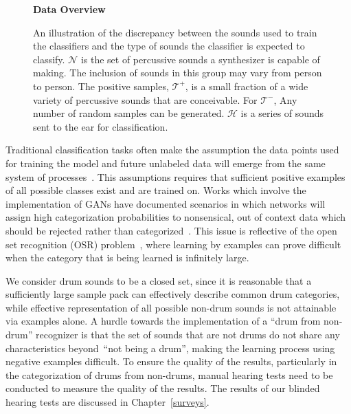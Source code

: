 \documentclass[\main/thesis.tex]{subfiles}
\begin{document}
\begin{figure}[]
    \begin{center}
    \textbf{Data Overview}
    \end{center}
    \caption{ An illustration of the discrepancy between the sounds used to train the classifiers and the type of sounds the classifier is expected to classify. $\mathcal{N}$ is the set of percussive sounds a synthesizer is capable of making. The inclusion of sounds in this group may vary from person to person. The positive samples, $\mathcal{T^{+}}$, is a small fraction of a wide variety of percussive sounds that are conceivable. For $\mathcal{T^{-}}$, Any number of random samples can be generated. $\mathcal{H}$ is a series of sounds sent to the ear for classification.}
\label{fig:ven_data}
\end{figure}

Traditional classification tasks often make the assumption the data points used for training the model and future unlabeled data will emerge from the same system of processes~\cite{geng2020recent,mundt2019open}. This assumptions requires that sufficient positive examples of all possible classes exist and are trained on. Works which involve the implementation of GANs have documented scenarios in which networks will assign high categorization probabilities to nonsensical, out of context data which should be rejected rather than categorized~\cite{geng2020recent,mundt2019open,hassen2020learning}. This issue is reflective of the open set recognition (OSR) problem~\cite{geng2020recent,mundt2019open}, where learning by examples can prove difficult when the category that is being learned is infinitely large. 

We consider drum sounds to be a closed set, since it is reasonable that a sufficiently large sample pack can effectively describe common drum categories, while effective representation of all possible non-drum sounds is not attainable via examples alone. A hurdle towards the implementation of a \enquote{drum from non-drum} recognizer is that the set of sounds that are not drums do not share any characteristics beyond~\enquote{not being a drum}, making the learning process using negative examples difficult.  To ensure the quality of the results, particularly in the categorization of drums from non-drums, manual hearing tests need to be conducted to measure the quality of the results. The results of our blinded hearing tests are discussed in Chapter~\ref{surveys}.
\end{document}
